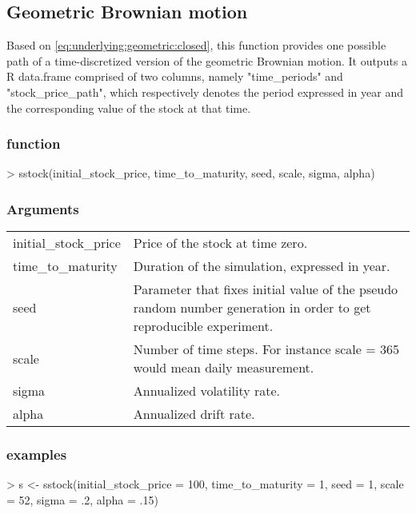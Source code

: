 \documentclass[12pt]{report}
\begin{document}
\begin{appendices}
\subsection{Geometric Brownian motion}
\label{sub:r:time:geometric}

Based on \cref{eq:underlying:geometric:closed}, this function provides one possible path of a time-discretized version of the geometric Brownian motion.
It outputs a R data.frame comprised of two columns, namely "time\_periods" and "stock\_price\_path", which respectively denotes the period expressed in year and the corresponding value of the stock at that time.

\subsubsection*{function}

\begin{Schunk}
\begin{Sinput}
> sstock(initial_stock_price, time_to_maturity, 
        seed, scale, sigma, alpha)
\end{Sinput}
\end{Schunk}

\subsubsection*{Arguments}

\begin{tabularx}{\textwidth}{lX}
  initial\_stock\_price & Price of the stock at time zero.\\
  time\_to\_maturity & Duration of the simulation, expressed in year.\\
  seed & Parameter that fixes initial value of the pseudo random number generation in order to get reproducible experiment. \\
  scale & Number of time steps. For instance scale = 365 would mean daily measurement.\\
  sigma & Annualized volatility rate. \\
  alpha & Annualized drift rate.
\end{tabularx}

\subsubsection*{examples}
\label{sec:r:time:geometric:ex}

\begin{Schunk}
\begin{Sinput}
> s <- sstock(initial_stock_price = 100,
        time_to_maturity = 1,
        seed = 1,
        scale = 52,
        sigma = .2,
        alpha = .15)
\end{Sinput}
\end{Schunk}



\end{appendices}
\end{document}
